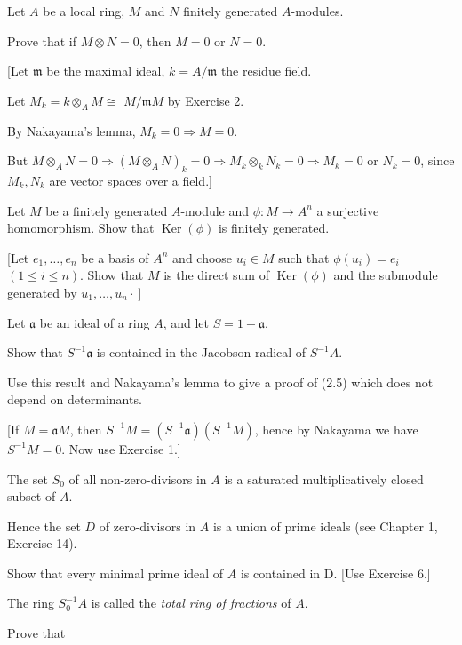 
Let $A$ be a local ring, $M$ and $N$ finitely generated $A$-modules.

Prove that if $M \otimes N=0$, then $M=0$ or $N=0$.

[Let $\mathfrak{m}$ be the maximal ideal, $k=A / \mathfrak{m}$ the residue field.

Let $M_k=k \otimes_A M \cong$ $M / \mathfrak{m} M$ by Exercise 2.

By Nakayama's lemma, $M_k=0 \Rightarrow M=0$.

But $M \otimes_A N=0 \Rightarrow\left(M \otimes_A N\right)_k=0 \Rightarrow M_k \otimes_k N_k=0 \Rightarrow M_k=0$ or $N_k=0$,
since $M_k, N_k$ are vector spaces over a field.]


Let $M$ be a finitely generated $A$-module and $\phi: M \rightarrow A^n$ a surjective homomorphism. Show that $\operatorname{Ker}(\phi)$ is finitely generated.

[Let $e_1, \ldots, e_n$ be a basis of $A^n$ and choose $u_i \in M$ such that $\phi\left(u_i\right)=e_i$ $(1 \leqslant i \leqslant n)$. Show that $M$ is the direct sum of $\operatorname{Ker}(\phi)$ and the submodule generated by $\left.u_1, \ldots, u_n \cdot\right]$


Let $\mathfrak{a}$ be an ideal of a ring $A$, and let $S=1+\mathfrak{a}$.

Show that $S^{-1} \mathfrak{a}$ is contained in the Jacobson radical of $S^{-1} A$.

Use this result and Nakayama's lemma to give a proof of (2.5) which does not depend on determinants.

[If $M=\mathfrak{a} M$, then $S^{-1} M=\left(S^{-1} \mathfrak{a}\right)\left(S^{-1} M\right)$, hence by Nakayama we have $S^{-1} M=0$. Now use Exercise 1.]


The set $S_0$ of all non-zero-divisors in $A$ is a saturated multiplicatively closed subset of $A$.

Hence the set $D$ of zero-divisors in $A$ is a union of prime ideals (see Chapter 1, Exercise 14).

Show that every minimal prime ideal of $A$ is contained in D. [Use Exercise 6.]

The ring $S_0^{-1} A$ is called the \textit{total ring of fractions} of $A$.

Prove that


